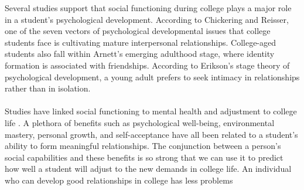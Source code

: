 \documentclass[journal]{./IEEE/IEEEtran}
\begin{document}
Several studies support that social functioning during college plays a major role in a student's psychological development. According to Chickering and Reisser, one of the seven vectors of psychological developmental issues that college students face is cultivating mature interpersonal relationships\cite{chickering}. College-aged students also fall within Arnett's emerging adulthood stage, where identity formation is associated with friendships\cite{erb}. According to Erikson's stage theory of psychological development, a young adult prefers to seek intimacy in relationships rather than in isolation\cite{erikson}.
\\
\\
Studies have linked social functioning to mental health and adjustment to college life \cite{erb}. A plethora of benefits such as psychological well-being, environmental mastery, personal growth, and self-acceptance have all been related to a student's ability to form meaningful relationships\cite{erb}. The conjunction between a person’s social capabilities and these benefits is so strong that we can use it to predict how well a student  will adjust to the new demands in college life. An individual who can develop good relationships in college has less problems
\end{document}
